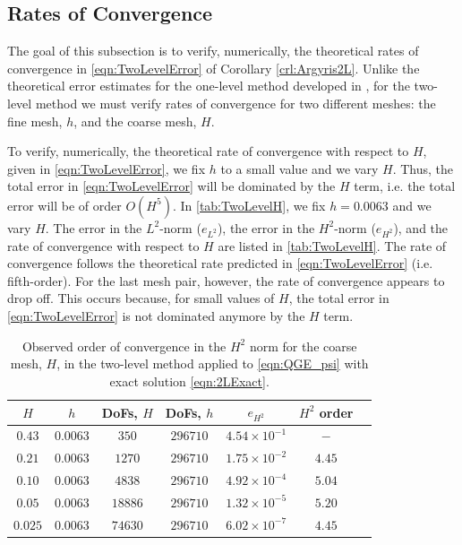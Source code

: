 \subsection{Rates of Convergence}\label{sse:Rates}
The goal of this subsection is to verify, numerically, the theoretical rates of
convergence in \eqref{eqn:TwoLevelError} of Corollary \ref{crl:Argyris2L}. Unlike
the theoretical error estimates for the one-level method developed in
\cite{Foster}, for the two-level method we must verify rates of convergence
for two different meshes: the fine mesh, $h$, and the coarse mesh, $H$.

To verify, numerically, the theoretical rate of convergence with respect to $H$,
given in \eqref{eqn:TwoLevelError}, we fix $h$ to a small value and we vary $H$.
Thus, the total error in \eqref{eqn:TwoLevelError} will be dominated by the $H$
term, i.e. the total error will be of order $O(H^5)$. In \autoref{tab:TwoLevelH},
we fix $h=0.0063$ and we vary $H$. The error in the $L^2$-norm ($e_{L^2}$), the
error in the $H^2$-norm ($e_{H^2}$), and the rate of convergence with respect to
$H$ are listed in \autoref{tab:TwoLevelH}. The rate of convergence follows the
theoretical rate predicted in \eqref{eqn:TwoLevelError} (i.e. fifth-order). For the
last mesh pair, however, the rate of convergence appears to drop off. This
occurs because, for small values of $H$, the total error in
\eqref{eqn:TwoLevelError} is not dominated anymore by the $H$ term.
\begin{table}
  \begin{center}
    \begin{tabular}{|c|c|c|c|c|c|c|}
    \hline
      $H$ &   $h$ &   DoFs, $ H $ & DoFs, $ h $ & $e_{H^2}$ & $H^2$ order \\
      \hline
      $0.43$ & $0.0063$ & $350$ & $296710$ & $4.54\times 10^{-1}$ & $-$ \\[0.2em]
      $0.21$ & $0.0063$ & $1270$ & $296710$ & $1.75\times 10^{-2}$ & $4.45$ \\[0.2em]
      $0.10$ & $0.0063$ & $4838$ & $296710$ & $4.92\times 10^{-4}$ & $5.04$ \\[0.2em]
      $0.05$ & $0.0063$ & $18886$ & $296710$ & $1.32\times 10^{-5}$ & $5.20$ \\[0.2em]
      $0.025$ & $0.0063$ & $74630$ & $296710$ & $6.02\times 10^{-7}$ & $4.45$ \\[0.2em]
      \hline
    \end{tabular}
  \end{center}
  \caption{Observed order of convergence in the $H^2$ norm for the coarse mesh,
    $H$, in the two-level method applied to \eqref{eqn:QGE_psi} with exact
    solution \eqref{eqn:2LExact}.}
  \label{tab:TwoLevelH}
\end{table}

